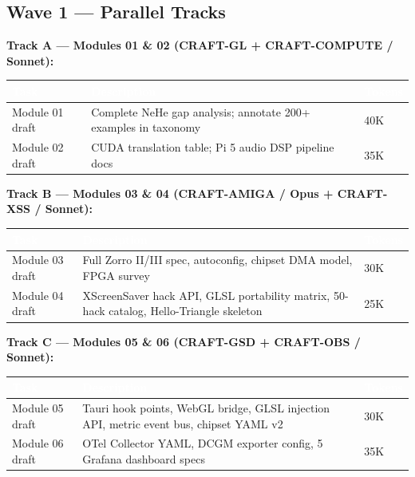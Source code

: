 \documentclass[11pt,letterpaper]{article}
\newcommand{\tableheader}[1]{\textbf{\sffamily\textcolor{white}{#1}}}
\begin{document}
\subsection{Wave 1 --- Parallel Tracks}

\textbf{Track A — Modules 01 \& 02 (CRAFT-GL + CRAFT-COMPUTE / Sonnet):}

\begin{center}
\begin{tabularx}{\textwidth}{L{3cm}XC{2.5cm}}
\toprule
{}
\tableheader{Task} & \tableheader{Description} & \tableheader{Tokens} \\
\midrule
Module 01 draft & Complete NeHe gap analysis; annotate 200+ examples in taxonomy & 40K \\
Module 02 draft & CUDA translation table; Pi 5 audio DSP pipeline docs & 35K \\
\bottomrule
\end{tabularx}
\end{center}

\textbf{Track B — Modules 03 \& 04 (CRAFT-AMIGA / Opus + CRAFT-XSS / Sonnet):}

\begin{center}
\begin{tabularx}{\textwidth}{L{3cm}XC{2.5cm}}
\toprule
{}
\tableheader{Task} & \tableheader{Description} & \tableheader{Tokens} \\
\midrule
Module 03 draft & Full Zorro II/III spec, autoconfig, chipset DMA model, FPGA survey & 30K \\
Module 04 draft & XScreenSaver hack API, GLSL portability matrix, 50-hack catalog, Hello-Triangle skeleton & 25K \\
\bottomrule
\end{tabularx}
\end{center}

\textbf{Track C — Modules 05 \& 06 (CRAFT-GSD + CRAFT-OBS / Sonnet):}

\begin{center}
\begin{tabularx}{\textwidth}{L{3cm}XC{2.5cm}}
\toprule
{}
\tableheader{Task} & \tableheader{Description} & \tableheader{Tokens} \\
\midrule
Module 05 draft & Tauri hook points, WebGL bridge, GLSL injection API, metric event bus, chipset YAML v2 & 30K \\
Module 06 draft & OTel Collector YAML, DCGM exporter config, 5 Grafana dashboard specs & 35K \\
\bottomrule
\end{tabularx}
\end{center}
\end{document}
